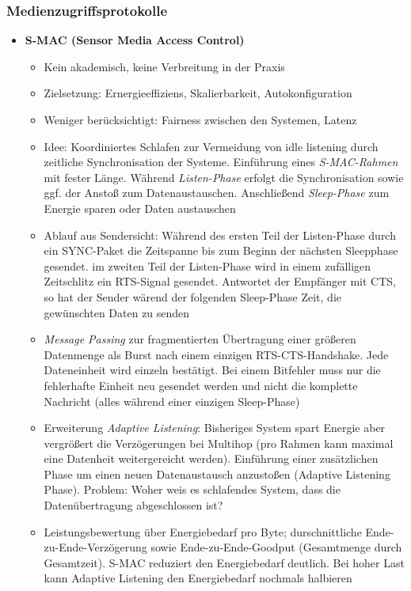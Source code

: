 \subsubsection{Medienzugriffsprotokolle}
\begin{itemize}
	\item \textbf{S-MAC (Sensor Media Access Control)}
	\begin{itemize}
		\item Kein akademisch, keine Verbreitung in der Praxis
		\item Zielsetzung: Ernergieeffiziens, Skalierbarkeit, Autokonfiguration
		\item Weniger berücksichtigt: Fairness zwischen den Systemen, Latenz
		\item Idee: Koordiniertes Schlafen zur Vermeidung von idle listening durch zeitliche Synchronisation der Systeme. Einführung eines \textit{S-MAC-Rahmen} mit fester Länge. Während \textit{Listen-Phase} erfolgt die Synchronisation sowie ggf. der Anstoß zum Datenaustauschen. Anschließend \textit{Sleep-Phase} zum Energie sparen oder Daten austauschen
		\item Ablauf aus Sendersicht: Während des ersten Teil der Listen-Phase durch ein SYNC-Paket die Zeitspanne bis zum Beginn der nächsten Sleepphase gesendet. im zweiten Teil der Listen-Phase wird in einem zufälligen Zeitschlitz ein RTS-Signal gesendet. Antwortet der Empfänger mit CTS, so hat der Sender wärend der folgenden Sleep-Phase Zeit, die gewünschten Daten zu senden
		\item \textit{Message Passing} zur fragmentierten Übertragung einer größeren Datenmenge als Burst nach einem einzigen RTS-CTS-Handshake. Jede Dateneinheit wird einzeln bestätigt. Bei einem Bitfehler muss nur die fehlerhafte Einheit neu gesendet werden und nicht die komplette Nachricht (alles während einer einzigen Sleep-Phase)
		\item Erweiterung \textit{Adaptive Listening}: Bisheriges System spart Energie aber vergrößert die Verzögerungen bei Multihop (pro Rahmen kann maximal eine Datenheit weitergereicht werden). Einführung einer zusätzlichen Phase um einen neuen Datenaustausch anzustoßen (Adaptive Listening Phase). Problem: Woher weis es schlafendes System, dass die Datenübertragung abgeschlossen ist?
		\item Leistungsbewertung über Energiebedarf pro Byte; durschnittliche Ende-zu-Ende-Verzögerung sowie Ende-zu-Ende-Goodput (Gesamtmenge durch Gesamtzeit). S-MAC reduziert den Energiebedarf deutlich. Bei hoher Last kann Adaptive Listening den Energiebedarf nochmals halbieren

\end{itemize}
\end{itemize}

